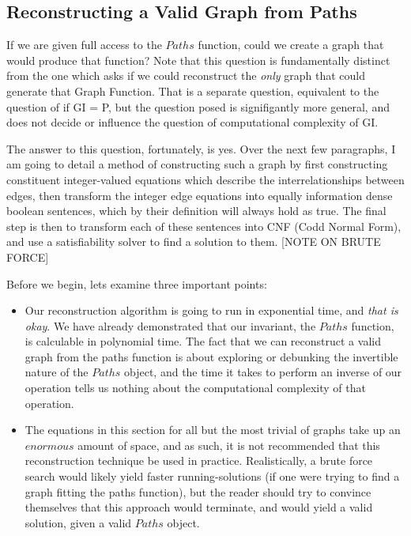 \documentclass[11pt,a4paper]{report}
\begin{document}
\subsection{Reconstructing a Valid Graph from Paths}
If we are given full access to the \(Paths\) function, could we create a graph that would produce that function?
Note that this question is fundamentally distinct from the one which asks if we could reconstruct the \emph{only} graph that could generate that Graph Function.
That is a separate question, equivalent to the question of if GI = P, but the question posed is signifigantly more general, and does not decide or influence the question of computational complexity of GI.

The answer to this question, fortunately, is yes.  
Over the next few paragraphs, I am going to detail a method of constructing such a graph by first constructing constituent integer-valued equations which describe the interrelationships between edges, then transform the integer edge equations into equally information dense boolean sentences, which by their definition will always hold as true.  
The final step is then to transform each of these sentences into CNF (Codd Normal Form), and use a satisfiability solver to find a solution to them.
[NOTE ON BRUTE FORCE]

Before we begin, lets examine three important points:
\begin{itemize}
  \item{
  	Our reconstruction algorithm is going to run in exponential time, and \emph{that is okay}.  
  	We have already demonstrated that our invariant, the \(Paths\) function, is calculable in polynomial time.  
  	The fact that we can reconstruct a valid graph from the paths function is about exploring or debunking the invertible nature of the \(Paths\) object, 
  	and the time it takes to perform an inverse of our operation tells us nothing about the computational complexity of that operation.
  }
  \item{
  	The equations in this section for all but the most trivial of graphs take up an \(enormous\) amount of space, and as such, it is not recommended that this reconstruction technique be used in practice.  
  	Realistically, a brute force search would likely yield faster running-solutions (if one were trying to find a graph fitting the paths function), but the reader should try to convince themselves that this approach would terminate, 
  	and would yield a valid solution, given a valid \(Paths\) object.
  }
\end{itemize}
\end{document}
